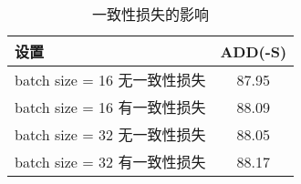 \begin{table}[htbp]
    \centering
    \caption{一致性损失的影响}
    \begin{tabular}{lc}
    \toprule 
    设置 & ADD(-S) \\
    \midrule
    batch size = 16 无一致性损失 & 87.95 \\
    batch size = 16 有一致性损失 & 88.09 \\
    \midrule
    batch size = 32 无一致性损失 & 88.05 \\
    batch size = 32 有一致性损失 & 88.17 \\
    \bottomrule
  \end{tabular}
  \label{tab:consistent_loss}
\end{table}